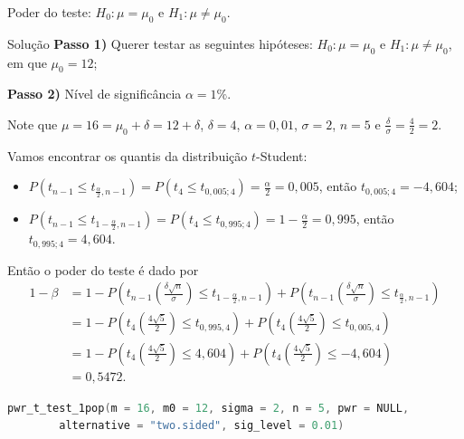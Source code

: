 \documentclass[8pt]{beamer}
\begin{document}
\begin{frame}[fragile]{Poder do teste: $H_0:\mu = \mu_0$ e $H_1: \mu \neq \mu_0$.}

\small

\begin{block}{Solução}
	\textbf{Passo 1)} Querer testar as seguintes hipóteses: $H_0: \mu = \mu_0$ e $H_1: \mu \neq \mu_0$, em que $\mu_0=12$;
	
	\textbf{Passo 2)} Nível de significância $\alpha=1\%$.
	
	
	Note que $\mu=16=\mu_0+\delta=12+\delta$, $\delta=4$, $\alpha=0,01$, $\sigma=2$, $n=5$ e $\frac{\delta}{\sigma} = \frac{4}{2}=2$.
	
	Vamos encontrar os quantis da distribuição $t$-Student:
	\begin{itemize}
		\item $P(t_{n-1} \leq t_{\frac{\alpha}{2}, n-1} ) = P(t_{4} \leq t_{0,005; 4} ) = \frac{\alpha}{2} = 0,005$, então $t_{0,005; 4}=-4,604$;
		\item $P(t_{n-1} \leq t_{1-\frac{\alpha}{2}, n-1} ) = P(t_{4} \leq t_{0,995; 4} ) =1- \frac{\alpha}{2} = 0,995$, então $t_{0,995; 4}=4,604$.
	\end{itemize}
	
	Então o poder do teste é dado por
	\begin{align*}
		1-\beta &= 1 - P\left( t_{n-1}\left(\frac{\delta\sqrt{n}}{\sigma}\right) \leq t_{1-\frac{\alpha}{2}, n-1} \right) + P\left( t_{n-1}\left(\frac{\delta\sqrt{n}}{\sigma}\right) \leq t_{\frac{\alpha}{2}, n-1} \right)\\
		&= 1 - P\left( t_{4}\left(\frac{4\sqrt{5}}{2}\right) \leq t_{0,995, 4} \right) + P\left( t_{4}\left(\frac{4\sqrt{5}}{2}\right) \leq t_{0,005, 4} \right)\\
		&= 1 - P\left( t_{4}\left(\frac{4\sqrt{5}}{2}\right) \leq 4,604 \right) + P\left( t_{4}\left(\frac{4\sqrt{5}}{2}\right) \leq -4,604 \right)\\
		&= 0,5472.
	\end{align*} 
\end{block}

\begin{lstlisting}[language = C, caption = Código no R.]
pwr_t_test_1pop(m = 16, m0 = 12, sigma = 2, n = 5, pwr = NULL,
		alternative = "two.sided", sig_level = 0.01)
\end{lstlisting}
\normalsize


\end{frame}
\end{document}
